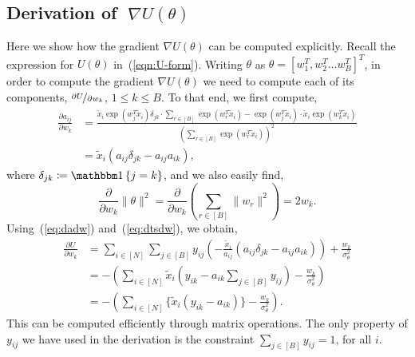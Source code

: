 \subsection{Derivation of {\boldmath $\;\nabla U(\theta)$}}
\label{appdx:gradu}
Here we show how the gradient 
$\nabla U(\theta)$ can be computed explicitly.
Recall the expression for $U(\theta)$ in~(\ref{eqn:U-form}).
Writing $\theta$ as
$\theta = \left[w_1^T, w_2^T \dots w_B^T  \right]^T$,
in order to compute the gradient
$\nabla U(\theta)$ we need to compute
each of its components,
$\nicefrac{\partial U}{\partial w_k}$,
$1\leq k\leq B$.
To that end, we first compute,
%
\begin{align}
	\frac{\partial a_{ij}}{\partial w_k} &= \frac
	{\tilde{x}_i \exp(w_j^T \tilde{x}_i) \delta_{jk} \cdot \sum_{r \in [B]} \exp(w_r^T \tilde{x}_i) 
		- 
		\exp(w_j^T \tilde{x}_i) \cdot \tilde{x}_i \exp(w_k^T \tilde{x}_i)}
	{\left( \sum_{r \in [B]} \exp(w_r^T \tilde{x}_i) \right)^2} \nonumber \\
	&= \tilde{x}_i \left( a_{ij} \delta_{jk} - a_{ij}a_{ik} \right), 
	\label{eq:dadw}
\end{align}
%
where $\delta_{jk} \coloneqq \one \left\{ j = k \right\}$,
and we also easily find,
%
\begin{equation}
	\frac{ \partial}{\partial w_k} \|\theta\|^2 = \frac{\partial}{\partial w_k} \left( \sum_{r \in [B]} \|w_r\|^2 \right) = 2w_k.
	\label{eq:dtsdw}
\end{equation}
%
Using~(\ref{eq:dadw}) and~(\ref{eq:dtsdw}), we obtain,
\begin{align}
	\frac{\partial U}{\partial w_k} &= 
	\sum_{i \in [N]} \sum_{j \in [B]} y_{ij} 
	\left( -\frac{\tilde{x}_i}{a_{ij}} \left( a_{ij} \delta_{jk} - a_{ij} a_{ik} \right) \right)
	+ \frac{w_k}{\sigma_\theta^2} \nonumber \\
	&=  - \left( \sum_{i \in [N]} \tilde{x}_i \left( y_{ik} - a_{ik} \sum_{j \in [B]} y_{ij} \right)
	- \frac{w_k}{\sigma_\theta^2} \right) \nonumber \\
	&= - \left( \sum_{i \in [N]} \Big\{ \tilde{x}_i (y_{ik} - a_{ik}) \Big\} - \frac{w_k}{\sigma_\theta^2} \right).
\end{align}
%
This can be computed 
efficiently through matrix operations. The only property of $y_{ij}$ 
we have used in the derivation is the constraint $\sum_{j \in [B]} y_{ij} = 1$,
for all $i$.